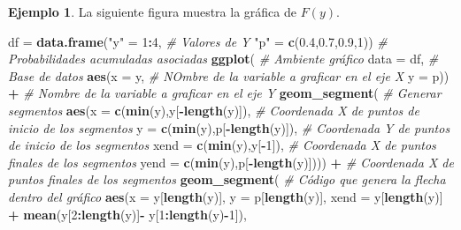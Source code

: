 \documentclass[
  11pt,
]{book}
\newenvironment{Shaded}{\begin{snugshade}}{\end{snugshade}}
\newcommand{\AttributeTok}[1]{\textcolor[rgb]{0.13,0.29,0.53}{#1}}
\newcommand{\CommentTok}[1]{\textcolor[rgb]{0.56,0.35,0.01}{\textit{#1}}}
\newcommand{\DecValTok}[1]{\textcolor[rgb]{0.00,0.00,0.81}{#1}}
\newcommand{\FloatTok}[1]{\textcolor[rgb]{0.00,0.00,0.81}{#1}}
\newcommand{\FunctionTok}[1]{\textcolor[rgb]{0.13,0.29,0.53}{\textbf{#1}}}
\newcommand{\NormalTok}[1]{#1}
\newcommand{\OtherTok}[1]{\textcolor[rgb]{0.56,0.35,0.01}{#1}}
\newcommand{\SpecialCharTok}[1]{\textcolor[rgb]{0.81,0.36,0.00}{\textbf{#1}}}
\newcommand{\StringTok}[1]{\textcolor[rgb]{0.31,0.60,0.02}{#1}}
\theoremstyle{definition}
\theoremstyle{definition}
\newtheorem{example}{Ejemplo}[chapter]
\theoremstyle{definition}
\theoremstyle{definition}
\theoremstyle{remark}
\begin{document}
\begin{example}
La siguiente figura muestra la gráfica de \(F(y)\).

\begin{Shaded}
\begin{Highlighting}[]
\NormalTok{df }\OtherTok{=} \FunctionTok{data.frame}\NormalTok{(}\StringTok{"y"} \OtherTok{=} \DecValTok{1}\SpecialCharTok{:}\DecValTok{4}\NormalTok{, }\CommentTok{\# Valores de Y}
                \StringTok{"p"} \OtherTok{=} \FunctionTok{c}\NormalTok{(}\FloatTok{0.4}\NormalTok{,}\FloatTok{0.7}\NormalTok{,}\FloatTok{0.9}\NormalTok{,}\DecValTok{1}\NormalTok{)) }\CommentTok{\# Probabilidades acumuladas asociadas}
\FunctionTok{ggplot}\NormalTok{( }\CommentTok{\# Ambiente gráfico}
  \AttributeTok{data =}\NormalTok{ df, }\CommentTok{\# Base de datos}
  \FunctionTok{aes}\NormalTok{(}\AttributeTok{x =}\NormalTok{ y, }\CommentTok{\# NOmbre de la variable a graficar en el eje X}
      \AttributeTok{y =}\NormalTok{ p)) }\SpecialCharTok{+} \CommentTok{\# Nombre de la variable a graficar en el eje Y}
  \FunctionTok{geom\_segment}\NormalTok{( }\CommentTok{\# Generar segmentos}
    \FunctionTok{aes}\NormalTok{(}\AttributeTok{x =} \FunctionTok{c}\NormalTok{(}\FunctionTok{min}\NormalTok{(y),y[}\SpecialCharTok{{-}}\FunctionTok{length}\NormalTok{(y)]), }\CommentTok{\# Coordenada X de puntos de inicio de los segmentos}
        \AttributeTok{y =} \FunctionTok{c}\NormalTok{(}\FunctionTok{min}\NormalTok{(y),p[}\SpecialCharTok{{-}}\FunctionTok{length}\NormalTok{(y)]), }\CommentTok{\# Coordenada Y de puntos de inicio de los segmentos}
        \AttributeTok{xend =} \FunctionTok{c}\NormalTok{(}\FunctionTok{min}\NormalTok{(y),y[}\SpecialCharTok{{-}}\DecValTok{1}\NormalTok{]), }\CommentTok{\# Coordenada X de puntos finales de los segmentos}
        \AttributeTok{yend =} \FunctionTok{c}\NormalTok{(}\FunctionTok{min}\NormalTok{(y),p[}\SpecialCharTok{{-}}\FunctionTok{length}\NormalTok{(y)]))) }\SpecialCharTok{+} \CommentTok{\# Coordenada X de puntos finales de los segmentos}
  \FunctionTok{geom\_segment}\NormalTok{( }\CommentTok{\# Código que genera la flecha dentro del gráfico}
    \FunctionTok{aes}\NormalTok{(}\AttributeTok{x =}\NormalTok{ y[}\FunctionTok{length}\NormalTok{(y)],}
        \AttributeTok{y =}\NormalTok{ p[}\FunctionTok{length}\NormalTok{(y)],}
        \AttributeTok{xend =}\NormalTok{ y[}\FunctionTok{length}\NormalTok{(y)] }\SpecialCharTok{+} \FunctionTok{mean}\NormalTok{(y[}\DecValTok{2}\SpecialCharTok{:}\FunctionTok{length}\NormalTok{(y)]}\SpecialCharTok{{-}}\NormalTok{ y[}\DecValTok{1}\SpecialCharTok{:}\FunctionTok{length}\NormalTok{(y)}\SpecialCharTok{{-}}\DecValTok{1}\NormalTok{]),}

\end{Highlighting}
\end{Shaded}
\end{example}
\end{document}
